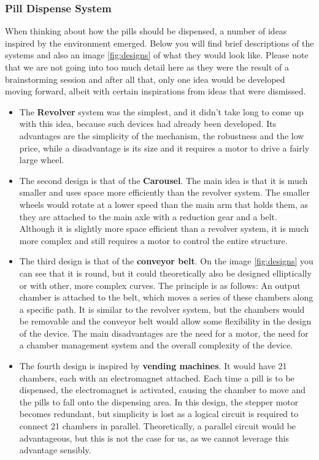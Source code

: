\subsubsection{Pill Dispense System}
When thinking about how the pills should be dispensed, a number of ideas inspired by the environment emerged. Below you will find brief descriptions of the systems and also an image \ref{fig:designs} of what they would look like. Please note that we are not going into too much detail here as they were the result of a brainstorming session and after all that, only one idea would be developed moving forward, albeit with certain inspirations from ideas that were dismissed.
\begin{itemize}
	\item The \textbf{Revolver} system was the simplest, and it didn't take long to come up with this idea, because such devices had already been developed\cite{LiveFinePillDispenser}. Its advantages are the simplicity of the mechanism, the robustness and the low price, while a disadvantage is its size and it requires a motor to drive a fairly large wheel.
	\item The second design is that of the \textbf{Carousel}. The main idea is that it is much smaller and uses space more efficiently than the revolver system. The smaller wheels would rotate at a lower speed than the main arm that holds them, as they are attached to the main axle with a reduction gear and a belt. Although it is slightly more space efficient than a revolver system, it is much more complex and still requires a motor to control the entire structure.
	\item The third design is that of the \textbf{conveyor belt}. On the image \ref{fig:designs} you can see that it is round, but it could theoretically also be designed elliptically or with other, more complex curves. The principle is as follows: An output chamber is attached to the belt, which moves a series of these chambers along a specific path. It is similar to the revolver system, but the chambers would be removable and the conveyor belt would allow some flexibility in the design of the device. The main disadvantages are the need for a motor, the need for a chamber management system and the overall complexity of the device.
	\item The fourth design is inspired by \textbf{vending machines}. It would have 21 chambers, each with an electromagnet attached. Each time a pill is to be dispensed, the electromagnet is activated, causing the chamber to move and the pills to fall onto the dispensing area. In this design, the stepper motor becomes redundant, but simplicity is lost as a logical circuit is required to connect 21 chambers in parallel. Theoretically, a parallel circuit would be advantageous, but this is not the case for us, as we cannot leverage this advantage sensibly.
\end{itemize}
